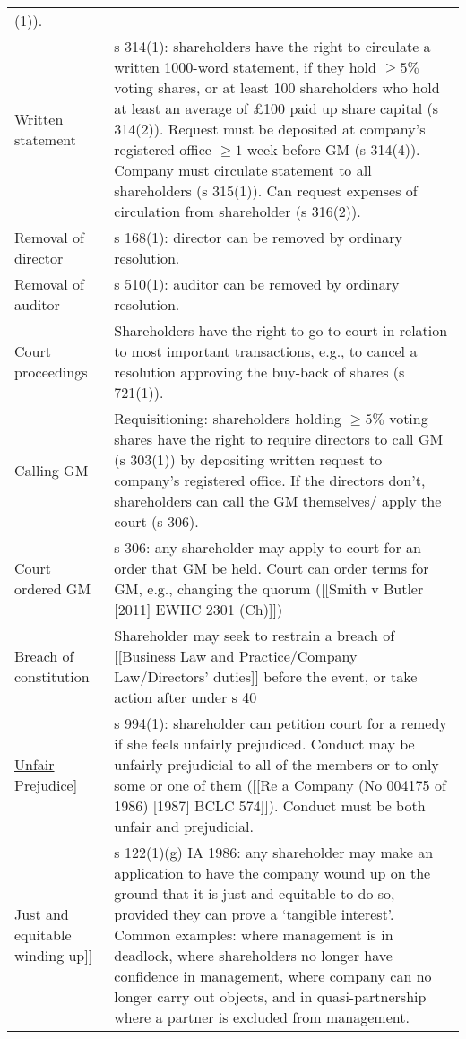\documentclass[
]{article}
\begin{document}
\begin{longtable}[]{@{}
  >{\raggedright\arraybackslash}p{}
  >{\raggedright\arraybackslash}p{}@{}}
294(1)). \\
Written statement & s 314(1): shareholders have the right to circulate a
written 1000-word statement, if they hold \(\geq 5\%\) voting shares, or
at least 100 shareholders who hold at least an average of £100 paid up
share capital (s 314(2)). Request must be deposited at company's
registered office \(\geq 1\) week before GM (s 314(4)). Company must
circulate statement to all shareholders (s 315(1)). Can request expenses
of circulation from shareholder (s 316(2)). \\
Removal of director & s 168(1): director can be removed by ordinary
resolution. \\
Removal of auditor & s 510(1): auditor can be removed by ordinary
resolution. \\
Court proceedings & Shareholders have the right to go to court in
relation to most important transactions, e.g., to cancel a resolution
approving the buy-back of shares (s 721(1)). \\
Calling GM & Requisitioning: shareholders holding \(\geq 5\%\) voting
shares have the right to require directors to call GM (s 303(1)) by
depositing written request to company's registered office. If the
directors don't, shareholders can call the GM themselves/ apply the
court (s 306). \\
Court ordered GM & s 306: any shareholder may apply to court for an
order that GM be held. Court can order terms for GM, e.g., changing the
quorum ({[}{[}Smith v Butler {[}2011{]} EWHC 2301 (Ch){]}{]}) \\
Breach of constitution & Shareholder may seek to restrain a breach of
{[}{[}Business Law and Practice/Company Law/Directors' duties{]}{]}
before the event, or take action after under s 40 \\
{[}\protect\hyperlink{unfair-prejudice}{Unfair Prejudice}{]} & s 994(1):
shareholder can petition court for a remedy if she feels unfairly
prejudiced. Conduct may be unfairly prejudicial to all of the members or
to only some or one of them ({[}{[}Re a Company (No 004175 of 1986)
{[}1987{]} BCLC 574{]}{]}). Conduct must be both unfair and
prejudicial. \\
{[}{[}Just and equitable winding up{]}{]} & s 122(1)(g) IA 1986: any
shareholder may make an application to have the company wound up on the
ground that it is just and equitable to do so, provided they can prove a
`tangible interest'. Common examples: where management is in deadlock,
where shareholders no longer have confidence in management, where
company can no longer carry out objects, and in quasi-partnership where
a partner is excluded from management. \\
\bottomrule()
\end{longtable}
\end{document}
